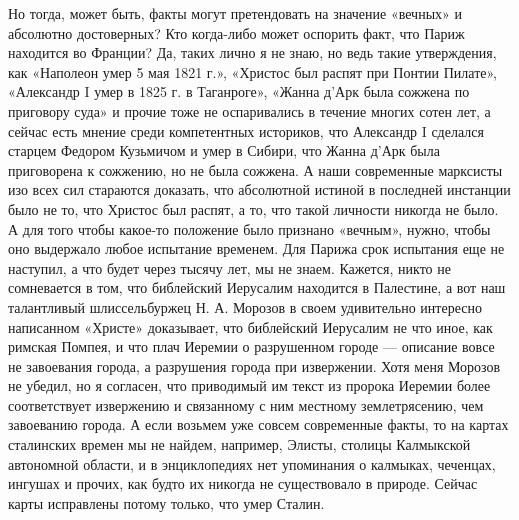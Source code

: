 Но тогда, может быть, факты могут претендовать на значение «вечных» и абсолютно
достоверных? Кто когда-либо может оспорить факт, что Париж находится во
Франции? Да, таких лично я не знаю, но ведь такие утверждения, как «Наполеон
умер 5 мая 1821 г.», «Христос был распят при Понтии Пилате», «Александр I умер
в 1825 г. в Таганроге», «Жанна д'Арк была сожжена по приговору суда» и прочие
тоже не оспаривались в течение многих сотен лет, а сейчас есть мнение среди
компетентных историков, что Александр I сделался старцем Федором Кузьмичом и
умер в Сибири, что Жанна д'Арк была приговорена к сожжению, но не была сожжена.
А наши современные марксисты изо всех сил стараются доказать, что абсолютной
истиной в последней инстанции было не то, что Христос был распят, а то, что
такой личности никогда не было. А для того чтобы какое-то положение было
признано «вечным», нужно, чтобы оно выдержало любое испытание временем. Для
Парижа срок испытания еще не наступил, а что будет через тысячу лет, мы не
знаем. Кажется, никто не сомневается в том, что библейский Иерусалим находится
в Палестине, а вот наш талантливый шлиссельбуржец Н. А. Морозов в своем
удивительно интересно написанном «Христе» доказывает, что библейский Иерусалим
не что иное, как римская Помпея, и что плач Иеремии о разрушенном городе ---
описание вовсе не завоевания города, а разрушения города при извержении. Хотя
меня Морозов не убедил, но я согласен, что приводимый им текст из пророка
Иеремии более соответствует извержению и связанному с ним местному
землетрясению, чем завоеванию города. А если возьмем уже совсем современные
факты, то на картах сталинских времен мы не найдем, например, Элисты, столицы
Калмыкской автономной области, и в энциклопедиях нет упоминания о калмыках,
чеченцах, ингушах и прочих, как будто их никогда не существовало в природе.
Сейчас карты исправлены потому только, что умер Сталин.
